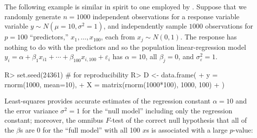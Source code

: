 \documentclass[
]{jss}
\begin{document}
The following example is similar in spirit to one employed by
\citet{HastieTibshiraniFriedman:2009}. Suppose that we randomly generate
\(n = 1000\) independent observations for a response variable variable
\(y \sim N(\mu = 10, \sigma^2 = 1)\), and independently sample \(1000\)
observations for \(p = 100\) ``predictors,'' \(x_1, \ldots, x_{100}\),
each from \(x_j \sim N(0, 1)\). The response has nothing to do with the
predictors and so the population linear-regression model
\(y_i = \alpha + \beta_1 x_{i1} + \cdots + \beta_{100} x_{i,100} + \varepsilon_i\)
has \(\alpha = 10\), all \(\beta_j = 0\), and
\(\sigma_\varepsilon^2 = 1\).

\begin{CodeChunk}
\begin{CodeInput}
R> set.seed(24361) # for reproducibility
R> D <- data.frame(
+   y = rnorm(1000, mean=10),
+   X = matrix(rnorm(1000*100), 1000, 100)
+ )
\end{CodeInput}
\end{CodeChunk}

Least-squares provides accurate estimates of the regression constant
\(\alpha = 10\) and the error variance \(\sigma^2 = 1\) for the ``null
model'' including only the regression constant; moreover, the omnibus
\(F\)-test of the correct null hypothesis that all of the \(\beta\)s are
0 for the ``full model'' with all 100 \(x\)s is associated with a large
\(p\)-value:
\end{document}
